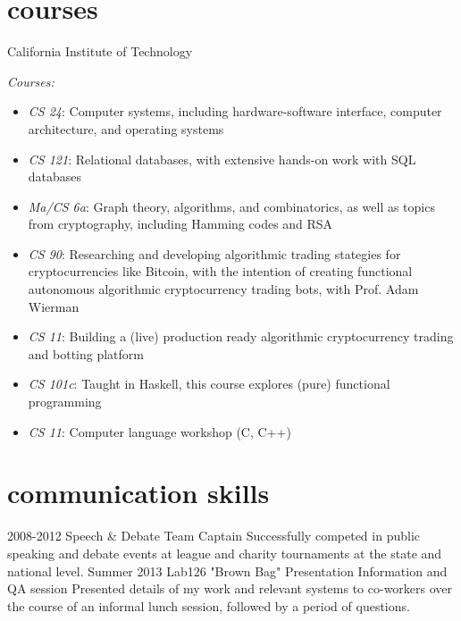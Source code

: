\documentclass[]{mills-cv} %
\begin{document}

\section{courses}

\begin{entrylist}
\entry
{}
{California Institute of Technology}
{}
{\emph{Courses:}
\begin{itemize}
\item \emph{CS 24}: Computer systems, including hardware-software interface, computer architecture, and operating systems
\item \emph{CS 121}: Relational databases, with extensive hands-on work with SQL databases
\item \emph{Ma/CS 6a}: Graph theory, algorithms, and combinatorics, as well as topics from cryptography, including Hamming codes and RSA
\item \emph{CS 90}: Researching and developing algorithmic trading stategies for cryptocurrencies like Bitcoin, with the intention of creating functional autonomous algorithmic cryptocurrency trading bots, with Prof. Adam Wierman
\item \emph{CS 11}: Building a (live) production ready algorithmic cryptocurrency trading and botting platform
\item \emph{CS 101c}: Taught in Haskell, this course explores (pure) functional programming
\item \emph{CS 11}: Computer language workshop (C, C++)
\end{itemize}}
\end{entrylist}


\section{communication skills}

\begin{entrylist}
\entry
{2008-2012}
{Speech \& Debate}
{Team Captain}
{Successfully competed in public speaking and debate events at league and charity tournaments at the state and national level.}
\entry
{Summer 2013}
{Lab126 "Brown Bag" Presentation}
{Information and QA session}
{Presented details of my work and relevant systems to co-workers over the course of an informal lunch session, followed by a period of questions.}
\end{entrylist}
\end{document}
